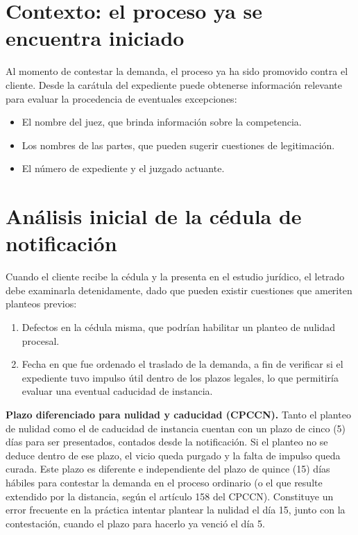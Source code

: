 \documentclass[12pt,oneside]{book}
\begin{document}
\section{Contexto: el proceso ya se encuentra iniciado}

Al momento de contestar la demanda, el proceso ya ha sido promovido contra el cliente. Desde la carátula del expediente puede obtenerse información relevante para evaluar la procedencia de eventuales excepciones:

\begin{itemize}
    \item El nombre del juez, que brinda información sobre la competencia.
    \item Los nombres de las partes, que pueden sugerir cuestiones de legitimación.
    \item El número de expediente y el juzgado actuante.
\end{itemize}

\section{Análisis inicial de la cédula de notificación}

Cuando el cliente recibe la cédula y la presenta en el estudio jurídico, el letrado debe examinarla detenidamente, dado que pueden existir cuestiones que ameriten planteos previos:

\begin{enumerate}[label=\Alph*.]
    \item Defectos en la cédula misma, que podrían habilitar un planteo de nulidad procesal.
    \item Fecha en que fue ordenado el traslado de la demanda, a fin de verificar si el expediente tuvo impulso útil dentro de los plazos legales, lo que permitiría evaluar una eventual caducidad de instancia.
\end{enumerate}

\begin{important}
\textbf{Plazo diferenciado para nulidad y caducidad (CPCCN).} Tanto el planteo de nulidad como el de caducidad de instancia cuentan con un plazo de cinco (5) días para ser presentados, contados desde la notificación. Si el planteo no se deduce dentro de ese plazo, el vicio queda purgado y la falta de impulso queda curada. Este plazo es diferente e independiente del plazo de quince (15) días hábiles para contestar la demanda en el proceso ordinario (o el que resulte extendido por la distancia, según el artículo 158 del CPCCN). Constituye un error frecuente en la práctica intentar plantear la nulidad el día 15, junto con la contestación, cuando el plazo para hacerlo ya venció el día 5.
\end{important}
\end{document}
